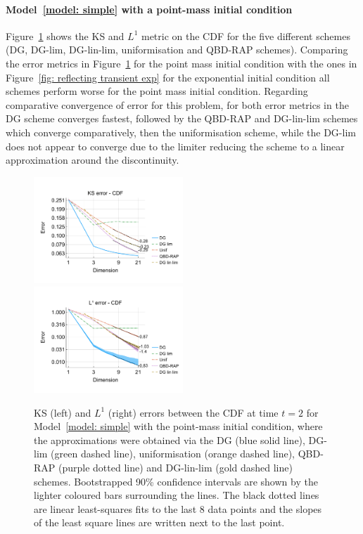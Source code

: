\paragraph{Model~\ref{model: simple} with a point-mass initial condition}
Figure~\ref{fig: reflecting transient pm} shows the KS and \(L^1\) metric on the CDF  for the five different schemes (DG, DG-lim, DG-lin-lim, uniformisation and QBD-RAP schemes). Comparing the error metrics in Figure~\ref{fig: reflecting transient pm} for the point mass initial condition with the ones in Figure~\ref{fig: reflecting transient exp} for the exponential initial condition all schemes perform worse for the point mass initial condition. Regarding comparative convergence of error for this problem, for both error metrics in the DG scheme converges fastest, followed by the QBD-RAP and DG-lin-lim schemes which converge comparatively, then the uniformisation scheme, while the DG-lim does not appear to converge due to the limiter reducing the scheme to a linear approximation around the discontinuity. %
\begin{figure}[h]
	\centering
	\includegraphics[width=0.5\textwidth,trim={0.75cm 0.8cm 0.25cm 1.25cm},clip]{chapter6/figs/hitting_times_model/reflecting_model/transient_distribution/point_mass/ks_error_formatted.pdf}%
	\includegraphics[width=0.5\textwidth,trim={0.75cm 0.8cm 0.25cm 1.25cm},clip]{chapter6/figs/hitting_times_model/reflecting_model/transient_distribution/point_mass/l1_cdf_error_formatted.pdf}
	\caption{KS (left) and \(L^1\) (right) errors between the CDF at time \(t=2\) for Model~\ref{model: simple} with the point-mass initial condition, where the approximations were obtained via the DG (blue solid line), DG-lim (green dashed line), uniformisation (orange dashed line), QBD-RAP (purple dotted line) and DG-lin-lim (gold dashed line) schemes. Bootstrapped 90\% confidence intervals are shown by the lighter coloured bars surrounding the lines. The black dotted lines are linear least-squares fits to the last 8 data points and the slopes of the least square lines are written next to the last point.} 
	\label{fig: reflecting transient pm} 
\end{figure}

